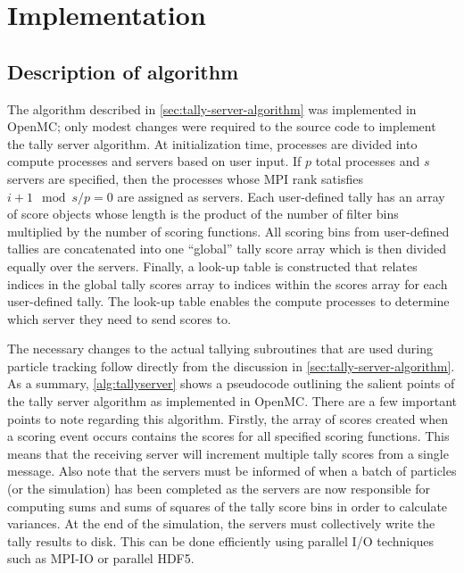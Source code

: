 \section{Implementation}
\label{sec:implementation}

\subsection{Description of algorithm}

The algorithm described in \autoref{sec:tally-server-algorithm} was implemented
in OpenMC; only modest changes were required to the source code to implement the
tally server algorithm. At initialization time, processes are divided into
compute processes and servers based on user input. If $p$ total processes and
$s$ servers are specified, then the processes whose MPI rank satisfies $i + 1
\mod s/p = 0$ are assigned as servers. Each user-defined tally has an array of
score objects whose length is the product of the number of filter bins
multiplied by the number of scoring functions. All scoring bins from
user-defined tallies are concatenated into one ``global'' tally score array
which is then divided equally over the servers. Finally, a look-up table is
constructed that relates indices in the global tally scores array to indices
within the scores array for each user-defined tally. The look-up table enables
the compute processes to determine which server they need to send scores to.

The necessary changes to the actual tallying subroutines that are used during
particle tracking follow directly from the discussion in
\autoref{sec:tally-server-algorithm}. As a summary, \autoref{alg:tallyserver}
shows a pseudocode outlining the salient points of the tally server algorithm as
implemented in OpenMC. There are a few important points to note regarding this
algorithm. Firstly, the array of scores created when a scoring event occurs
contains the scores for all specified scoring functions. This means that the
receiving server will increment multiple tally scores from a single
message. Also note that the servers must be informed of when a batch of
particles (or the simulation) has been completed as the servers are now
responsible for computing sums and sums of squares of the tally score bins in
order to calculate variances. At the end of the simulation, the servers must
collectively write the tally results to disk. This can be done efficiently using
parallel I/O techniques such as MPI-IO or parallel HDF5.

